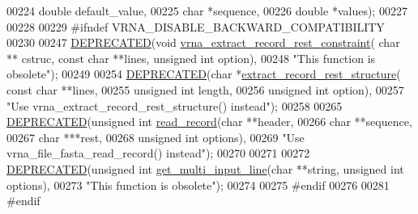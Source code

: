 \begin{DoxyCode}
00224                           \textcolor{keywordtype}{double} default\_value,
00225                           \textcolor{keywordtype}{char} *sequence,
00226                           \textcolor{keywordtype}{double} *values);
00227 
00228 
00229 \textcolor{preprocessor}{#ifndef VRNA\_DISABLE\_BACKWARD\_COMPATIBILITY}
00230 
00247 \mbox{\hyperlink{file__formats_8h_aab347a3c03fbe8e7319551b9fa0cce4a}{DEPRECATED}}(\textcolor{keywordtype}{void} \mbox{\hyperlink{group__file__utils_ga55a9ae6dfeecc1b3f0c2acf6fa796c15}{vrna\_extract\_record\_rest\_constraint}}( \textcolor{keywordtype}{char} **
      cstruc, \textcolor{keyword}{const} \textcolor{keywordtype}{char} **lines, \textcolor{keywordtype}{unsigned} \textcolor{keywordtype}{int} option),
00248           \textcolor{stringliteral}{"This function is obsolete"});
00249 
00254 \mbox{\hyperlink{file__formats_8h_aab347a3c03fbe8e7319551b9fa0cce4a}{DEPRECATED}}(\textcolor{keywordtype}{char} *\mbox{\hyperlink{group__file__utils_ga39af7b684657ed0efa467ef9865777b3}{extract\_record\_rest\_structure}}( \textcolor{keyword}{const} \textcolor{keywordtype}{char} **lines,
00255                                                 \textcolor{keywordtype}{unsigned} \textcolor{keywordtype}{int} length,
00256                                                 \textcolor{keywordtype}{unsigned} \textcolor{keywordtype}{int} option),
00257           \textcolor{stringliteral}{"Use vrna\_extract\_record\_rest\_structure() instead"});
00258 
00265 \mbox{\hyperlink{file__formats_8h_aab347a3c03fbe8e7319551b9fa0cce4a}{DEPRECATED}}(\textcolor{keywordtype}{unsigned} \textcolor{keywordtype}{int} \mbox{\hyperlink{group__file__utils_gafd194a69af9d92b5b0412a7627ac1595}{read\_record}}(\textcolor{keywordtype}{char} **header,
00266                                     \textcolor{keywordtype}{char} **sequence,
00267                                     \textcolor{keywordtype}{char}  ***rest,
00268                                     \textcolor{keywordtype}{unsigned} \textcolor{keywordtype}{int} options),
00269           \textcolor{stringliteral}{"Use vrna\_file\_fasta\_read\_record() instead"});
00270 
00271 
00272 \mbox{\hyperlink{file__formats_8h_aab347a3c03fbe8e7319551b9fa0cce4a}{DEPRECATED}}(\textcolor{keywordtype}{unsigned} \textcolor{keywordtype}{int} \mbox{\hyperlink{group__file__utils_ga61b9a7a4716c98a315ee9da411515f9c}{get\_multi\_input\_line}}(\textcolor{keywordtype}{char} **\textcolor{keywordtype}{string}, \textcolor{keywordtype}{unsigned} \textcolor{keywordtype}{int} 
      options),
00273           \textcolor{stringliteral}{"This function is obsolete"});
00274 
00275 \textcolor{preprocessor}{#endif}
00276 
00281 \textcolor{preprocessor}{#endif}
\end{DoxyCode}
